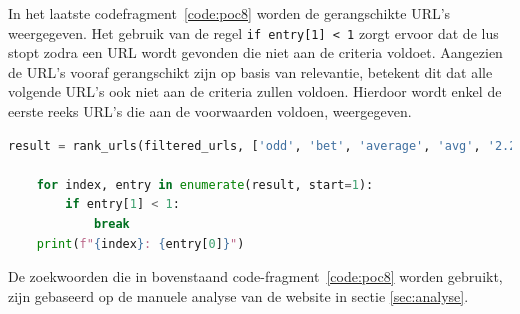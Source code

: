 In het laatste codefragment~\ref{code:poc8} worden de gerangschikte URL's weergegeven. Het gebruik van de regel \lstinline|if entry[1] < 1| zorgt ervoor dat de lus stopt zodra een URL wordt gevonden die niet aan de criteria voldoet. Aangezien de URL's vooraf gerangschikt zijn op basis van relevantie, betekent dit dat alle volgende URL's ook niet aan de criteria zullen voldoen. Hierdoor wordt enkel de eerste reeks URL's die aan de voorwaarden voldoen, weergegeven.
\begin{lstlisting}[language=python, captionpos=b, caption={Filteren van performance-logs }, label={code:poc8},float=h]
    result = rank_urls(filtered_urls, ['odd', 'bet', 'average', 'avg', '2.24', '1.70'])

    for index, entry in enumerate(result, start=1):
        if entry[1] < 1:
            break
    print(f"{index}: {entry[0]}")
\end{lstlisting}

De zoekwoorden die in bovenstaand code-fragment~\ref{code:poc8} worden gebruikt, zijn gebaseerd op de manuele analyse van de website in sectie \ref{sec:analyse}.

